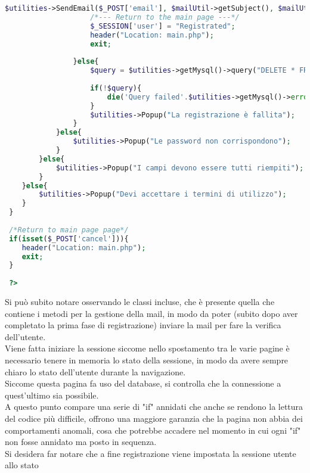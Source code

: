\begin{lstlisting}[language=php]
 					$utilities->SendEmail($_POST['email'], $mailUtil->getSubject(), $mailUtil->getBody($URLToSend), $mailUtil->getAlternativeBody($URLToSend));
 					/*--- Return to the main page ---*/
 					$_SESSION['user'] = "Registrated";
 					header("Location: main.php");
 					exit;
 					
 				}else{
 					$query = $utilities->getMysql()->query("DELETE * FROM usert_table1 WHERE (email = '{$email}')");
 					
 					if(!$query){
 						die('Query failed'.$utilities->getMysql()->error);
 					} 
					$utilities->Popup("La registrazione è fallita");
 				}
 			}else{
 				$utilities->Popup("Le password non corrispondono");
 			}
 		}else{
 			$utilities->Popup("I campi devono essere tutti riempiti");
 		}
 	}else{
 		$utilities->Popup("Devi accettare i termini di utilizzo");
 	}
 }
 
 /*Return to main page page*/
 if(isset($_POST['cancel'])){
 	header("Location: main.php");
 	exit;
 }
 
 ?>
 \end{lstlisting}
 
 Si può subito notare osservando le classi incluse, che è presente quella che contiene i metodi per la gestione della mail, in modo da poter (subito dopo aver completato la prima fase di registrazione) inviare la mail per fare la verifica dell'utente.\\
 Viene fatta iniziare la sessione siccome nello spostamento tra le varie pagine è necessario tenere in memoria lo stato della sessione, in modo da avere sempre chiaro lo stato dell'utente durante la navigazione.\\
 Siccome questa pagina fa uso del database, si controlla che la connessione a quest'ultimo sia possibile.\\
 A questo punto compare una serie di "if" annidati che anche se rendono la lettura del codice più difficile, offrono una maggiore garanzia che la pagina non abbia dei comportamenti anomali, cosa che potrebbe accadere nel momento in cui ogni "if" non fosse annidato ma posto in sequenza.\\
 Si desidera far notare che a fine registrazione viene impostata la sessione utente allo stato 